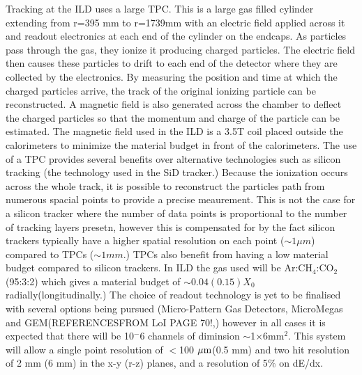 Tracking at the \ac{ILD} uses a large \ac{TPC}. This is a large gas filled cylinder extending from r=395 mm to r=1739mm with an electric field applied across it and readout electronics at each end of the cylinder on the endcaps. As particles pass through the gas, they ionize it producing charged particles. The electric field then causes these particles to drift to each end of the detector where they are collected by the electronics. By measuring the position and time at which the charged particles arrive, the track of the original ionizing particle can be reconstructed. A magnetic field is also generated across the chamber to deflect the charged particles so that the momentum and charge of the particle can be estimated. The magnetic field used in the ILD is a 3.5T coil placed outside the calorimeters to minimize the material budget in front of the calorimeters. The use of a \ac{TPC} provides several benefits over alternative technologies such as silicon tracking (the technology used in the \ac{SiD} tracker.) Because the ionization occurs across the whole track, it is possible to reconstruct the particles path from numerous spacial points to provide a precise meaurement. This is not the case for a silicon tracker where the number of data points is proportional to the number of tracking layers presetn, however this is compensated for by the fact silicon trackers typically have a higher spatial resolution on each point ($\sim 1 \mu m$) compared to TPCs ($\sim 1 mm$.) TPCs also benefit from having a low material budget compared to silicon trackers. In \ac{ILD} the gas used will be Ar:CH$_{4}$:CO$_{2}$ (95:3:2) which gives a material budget of $\sim 0.04(0.15)X_0$ radially(longitudinally.) The choice of readout technology is yet to be finalised with several options being pursued (Micro-Pattern Gas Detectors, MicroMegas and GEM(REFERENCESFROM LoI PAGE 70!,) however in all cases it is expected that there will be 10${^-6}$ channels of diminsion $\sim$1$\times$6mm$^{2}$. This system will allow a single point resolution of $<$100$~\mu\textrm{m}$(0.5 mm) and two hit resolution of 2 mm (6 mm)  in the x-y (r-z) planes, and a resolution of 5$\%$ on dE/dx.


